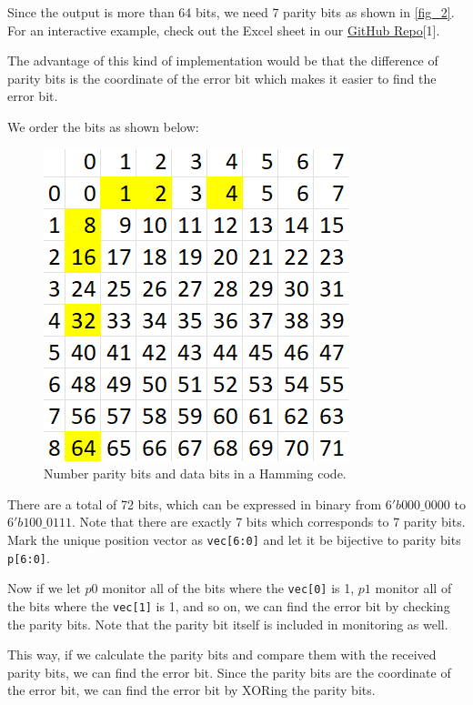 \documentclass[conference]{IEEEtran}
\begin{document}
Since the output is more than 64 bits, we need 7 parity bits as shown in
\ref{fig_2}. For an interactive example, check out the Excel sheet in our
\href{https://github.com/luckunately/ELEC433-Projects}{GitHub Repo}[1]. %

The advantage of this kind of implementation would be that the difference of
parity bits is the coordinate of the error bit which makes it easier to find
the error bit.

We order the bits as shown below:

\begin{figure}[htbp]
  \centerline{\includegraphics{Images/Hamming_bits_order.png}}
  \caption{Number parity bits and data bits in a Hamming code.}
  \label{fig_3}
\end{figure}

There are a total of 72 bits, which can be expressed in binary from
$6'b000\_0000$ to $6'b 100\_0111$. Note that there are exactly 7 bits which
corresponds to 7 parity bits. Mark the unique position vector as
\texttt{vec[6:0]} and let it be bijective to parity bits \texttt{p[6:0]}.

Now if we let $p0$ monitor all of the bits where the \texttt{vec[0]} is 1, $p1$
monitor all of the bits where the \texttt{vec[1]} is 1, and so on, we can find
the error bit by checking the parity bits. Note that the parity bit itself is
included in monitoring as well.

This way, if we calculate the parity bits and compare them with the received
parity bits, we can find the error bit. Since the parity bits are the
coordinate of the error bit, we can find the error bit by XORing the parity
bits.
\end{document}
